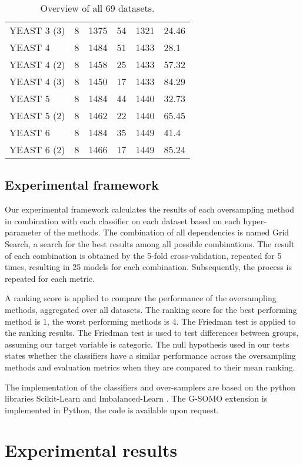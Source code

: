\documentclass[parskip=full]{scrartcl}
\begin{document}
\begin{table} [H]
\begin{tabular}{ |p{4cm}||p{2.2cm}|p{2.2cm}|p{2.2cm}|p{2.2cm}|p{2.2cm}|  }
YEAST 3 (3)&	8&	1375&	54&	1321&	24.46\\
YEAST 4&	8&	1484&	51&	1433&	28.1\\
YEAST 4 (2)&	8&	1458&	25&	1433&	57.32\\
YEAST 4 (3)&	8&	1450&	17&	1433&	84.29\\
YEAST 5&	8&	1484&	44&	1440&	32.73\\
YEAST 5 (2)&	8&	1462&	22&	1440&	65.45\\
YEAST 6&	8&	1484&	35&	1449&	41.4\\
YEAST 6 (2)&	8&	1466&	17&	1449&	85.24\\

 \hline
\end{tabular}

\caption{Overview of all 69 datasets.}
   \label{tab:test}
\end{table} 


\subsection{Experimental framework}

Our experimental framework calculates the results of each oversampling method in
combination with each classifier on each dataset based on each hyper-parameter
of the methods. The combination of all dependencies is named Grid Search, a
search for the best results among all possible combinations. The result of each
combination is obtained by the 5-fold cross-validation, repeated for 5 times,
resulting in 25 models for each combination. Subsequently, the process is
repeated for each metric. 

A ranking score is applied to compare the performance of the oversampling
methods, aggregated over all datasets. The ranking score for the best performing
method is 1, the worst performing methods is 4. The Friedman test is applied to
the ranking results. The Friedman test is used to test differences between
groups, assuming our target variable is categoric. The null hypothesis used in
our tests states whether the classifiers have a similar performance across the
oversampling methods and evaluation metrics when they are compared to their mean
ranking.

The implementation of the classifiers and over-samplers are based on the python
libraries Scikit-Learn \cite{Pedregosa2012} and Imbalanced-Learn
\cite{Lemaitre2016}. The G-SOMO extension is implemented in Python, the code is
available upon request.

\section{Experimental results}
\end{document}
